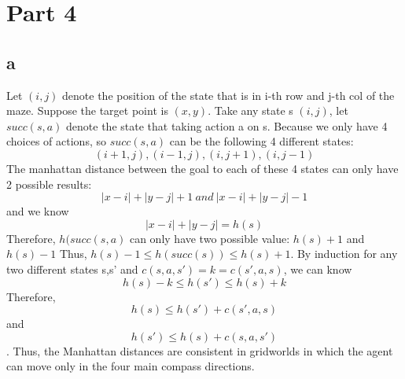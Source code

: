 \documentclass[11pt]{article}
\begin{document}

\section*{Part 4}




\subsection*{a}
Let $(i,j)$ denote the position of the state that is in i-th row and j-th col of the maze. Suppose the target point is $(x,y)$. Take any state s $(i,j)$, let $succ(s,a)$ denote the state that taking action a on s. Because we only have 4 choices of actions, so $succ(s,a)$ can be the following 4 different states:
$$(i+1,j),(i-1,j),(i,j+1),(i,j-1)$$ The manhattan  distance between the goal to each of these 4 states can only have 2 possible results:
$$|x-i|+|y-j|+1\ and \ |x-i|+|y-j|-1$$ and we know $$|x-i|+|y-j|=h(s)$$ Therefore, $h(succ(s,a)$ can only have two possible value: $h(s)+1$ and  $h(s)-1$
Thus, $h(s)-1\leq h(succ(s))\leq h(s)+1$. By induction for any two different states s,s' and $c(s,a,s')=k=c(s',a,s)$, we can know $$h(s)-k\leq h(s')\leq h(s)+k$$ Therefore, $$h(s)\leq h(s')+c(s',a,s)$$ and $$h(s')\leq h(s)+c(s,a,s')$$. Thus, the Manhattan distances are consistent in
gridworlds in which the agent can move only in the four main compass directions.
\end{document}
